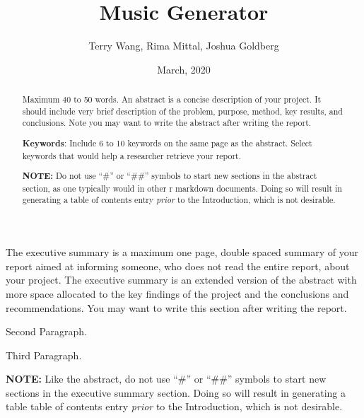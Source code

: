 \documentclass[12pt,oneside]{chicagocapstone}
\title{Music Generator}
\author{Terry Wang, Rima Mittal, Joshua Goldberg}
\date{March, 2020} %
\begin{document}
  \maketitle

\frontmatter %
\pagestyle{empty} %


  \begin{abstract}
    Maximum 40 to 50 words. An abstract is a concise description of your project. It should include very brief description of the problem, purpose, method, key results, and conclusions. Note you may want to write the abstract after writing the report.
    
    \bigskip 
    \bigskip
    \bigskip
    
    \textbf{Keywords}: Include 6 to 10 keywords on the same page as the abstract. Select keywords that would help a researcher retrieve your report.
    
    \bigskip 
    \bigskip
    \bigskip
    
    \textbf{NOTE:} Do not use ``\#'' or ``\#\#'' symbols to start new sections in the abstract section, as one typically would in other r markdown documents. Doing so will result in generating a table of contents entry \emph{prior} to the Introduction, which is not desirable.
  \end{abstract}
  \begin{executive}
    The executive summary is a maximum one page, double spaced summary of your report aimed at informing someone, who does not read the entire report, about your project. The executive summary is an extended version of the abstract with more space allocated to the key findings of the project and the conclusions and recommendations. You may want to write this section after writing the report.
    
    Second Paragraph.
    
    Third Paragraph.
    
    \bigskip
    \bigskip
    \bigskip
    
    \textbf{NOTE:} Like the abstract, do not use ``\#'' or ``\#\#'' symbols to start new sections in the executive summary section. Doing so will result in generating a table table of contents entry \emph{prior} to the Introduction, which is not desirable.
  \end{executive}
\end{document}
